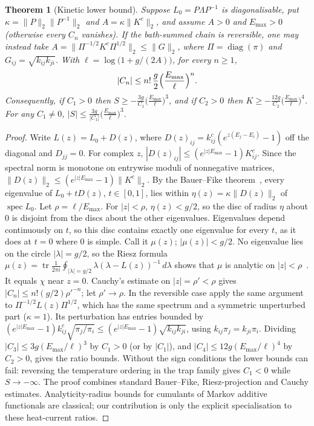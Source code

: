 \documentclass[11pt,a4paper]{article}
\newtheorem{theorem}{Theorem}[section]
\theoremstyle{remark}\newtheorem{remark}[theorem]{Remark}
\begin{document}
\begin{theorem}[Kinetic lower bound]\label{thm:kinetic}
Suppose $L_0=P\Lambda P^{-1}$ is diagonalisable, put $\kappa=\|P\|_2\|P^{-1}\|_2$ and $A=\kappa\|K^c\|_2$, and assume $A>0$ and $E_{\max}>0$ (otherwise every $C_n$ vanishes). If the bath-summed chain is reversible, one may instead take $A=\|\Pi^{-1/2}K^c\Pi^{1/2}\|_2\le\|G\|_2$, where $\Pi=\operatorname{diag}(\pi)$ and $G_{ij}=\sqrt{k_{ij}k_{ji}}$. With $\ell=\log\bigl(1+g/(2A)\bigr)$, for every $n\ge1$,
\begin{equation}\label{eq:kinbound}
|C_n|\le n!\,\frac g2\Bigl(\frac{E_{\max}}{\ell}\Bigr)^n .
\end{equation}
Consequently, if $C_1>0$ then $S\ge-\frac{3g}{C_1}\bigl(\frac{E_{\max}}{\ell}\bigr)^3$, and if $C_2>0$ then $K\ge-\frac{12g}{C_2}\bigl(\frac{E_{\max}}{\ell}\bigr)^4$. For any $C_1\ne0$, $|S|\le\frac{3g}{|C_1|}\bigl(\frac{E_{\max}}{\ell}\bigr)^3$.
\end{theorem}
\begin{proof}
Write $L(z)=L_0+D(z)$, where $D(z)_{ij}=k^c_{ij}(e^{z(E_j-E_i)}-1)$ off the diagonal and $D_{jj}=0$. For complex $z$, $|D(z)_{ij}|\le(e^{|z|E_{\max}}-1)K^c_{ij}$. Since the spectral norm is monotone on entrywise moduli of nonnegative matrices, $\|D(z)\|_2\le(e^{|z|E_{\max}}-1)\|K^c\|_2$. By the Bauer--Fike theorem~\cite{BauerFike1960}, every eigenvalue of $L_0+tD(z)$, $t\in[0,1]$, lies within $\eta(z)=\kappa\|D(z)\|_2$ of $\operatorname{spec}L_0$. Let $\rho=\ell/E_{\max}$. For $|z|<\rho$, $\eta(z)<g/2$, so the disc of radius $\eta$ about $0$ is disjoint from the discs about the other eigenvalues. Eigenvalues depend continuously on $t$, so this disc contains exactly one eigenvalue for every $t$, as it does at $t=0$ where $0$ is simple. Call it $\mu(z)$; $|\mu(z)|<g/2$. No eigenvalue lies on the circle $|\lambda|=g/2$, so the Riesz formula $\mu(z)=\operatorname{tr}\frac1{2\pi i}\oint_{|\lambda|=g/2}\lambda(\lambda-L(z))^{-1}\,d\lambda$ shows that $\mu$ is analytic on $|z|<\rho$~\cite{Kato1995}. It equals $\chi$ near $z=0$. Cauchy's estimate on $|z|=\rho'<\rho$ gives $|C_n|\le n!(g/2)\rho'^{-n}$; let $\rho'\to\rho$. In the reversible case apply the same argument to $\Pi^{-1/2}L(z)\Pi^{1/2}$, which has the same spectrum and a symmetric unperturbed part ($\kappa=1$). Its perturbation has entries bounded by $(e^{|z|E_{\max}}-1)k^c_{ij}\sqrt{\pi_j/\pi_i}\le(e^{|z|E_{\max}}-1)\sqrt{k_{ij}k_{ji}}$, using $k_{ij}\pi_j=k_{ji}\pi_i$. Dividing $|C_3|\le3g(E_{\max}/\ell)^3$ by $C_1>0$ (or by $|C_1|$), and $|C_4|\le12g(E_{\max}/\ell)^4$ by $C_2>0$, gives the ratio bounds. Without the sign conditions the lower bounds can fail: reversing the temperature ordering in the trap family gives $C_1<0$ while $S\to-\infty$. The proof combines standard Bauer--Fike, Riesz-projection and Cauchy estimates. Analyticity-radius bounds for cumulants of Markov additive functionals are classical; our contribution is only the explicit specialisation to these heat-current ratios.
\end{proof}
\end{document}
